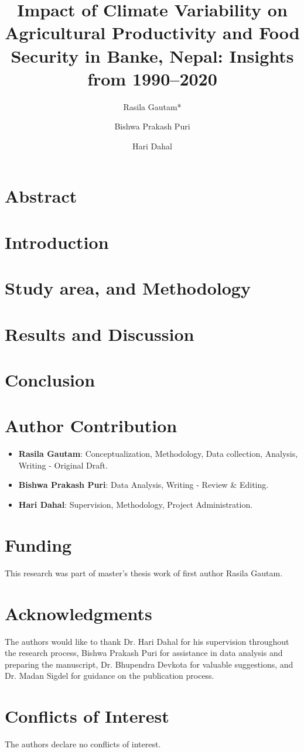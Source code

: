 \documentclass[a4paper,12pt]{article}
\title{Impact of Climate Variability on Agricultural Productivity and Food Security in Banke, Nepal: Insights from 1990--2020}
\author[1]{Rasila Gautam*}
\author[1]{Bishwa Prakash Puri}
\author[1]{Hari Dahal}
\affil[1]{College of Applied Sciences-Nepal, Tribhuvan University, Kathmandu, Nepal}
\affil[*]{Correspondence Author: \texttt{rasilagautam2@gmail.com}}
\date{}
\begin{document}
\maketitle

\section*{Abstract}



\section{Introduction}


\section{Study area, and Methodology}


\section{Results and Discussion}




\section{Conclusion}


\section*{Author Contribution}
\begin{itemize}
    \item \textbf{Rasila Gautam}: Conceptualization, Methodology, Data collection, Analysis, Writing - Original Draft.
    \item \textbf{Bishwa Prakash Puri}: Data Analysis, Writing - Review \& Editing.
    \item \textbf{Hari Dahal}: Supervision, Methodology, Project Administration.
\end{itemize}
\section*{Funding}
This research was part of master's thesis work of first author Rasila Gautam.

\section*{Acknowledgments}
The authors would like to thank Dr. Hari Dahal for his supervision throughout the research process, Bishwa Prakash Puri for assistance in data analysis and preparing the manuscript, Dr. Bhupendra Devkota for valuable suggestions, and Dr. Madan Sigdel for guidance on the publication process.


\section*{Conflicts of Interest}
The authors declare no conflicts of interest.
\printbibliography
\end{document}
